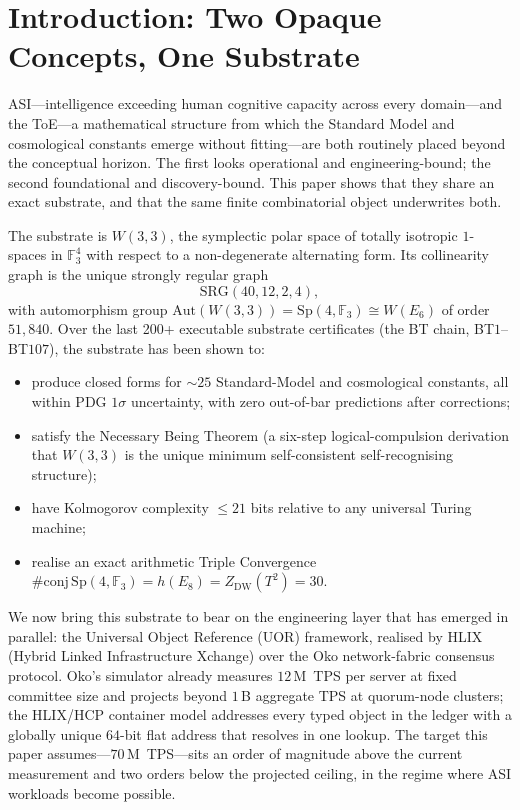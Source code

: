 \documentclass[11pt,letterpaper]{article}
\theoremstyle{remark}
\newcommand{\W}{W(3,3)}
\newcommand{\Sp}{\mathrm{Sp}}
\newcommand{\Aut}{\mathrm{Aut}}
\newcommand{\FF}{\mathbb{F}}
\newcommand{\SRG}[4]{\mathrm{SRG}(#1,#2,#3,#4)}
\begin{document}
\section{Introduction: Two Opaque Concepts, One Substrate}

ASI---intelligence exceeding human cognitive capacity across every domain---and the ToE---a
mathematical structure from which the Standard Model and cosmological constants emerge
without fitting---are both routinely placed beyond the conceptual horizon. The first looks
operational and engineering-bound; the second foundational and discovery-bound. This paper
shows that they share an exact substrate, and that the same finite combinatorial object
underwrites both.

The substrate is $\W$, the symplectic polar space of totally isotropic $1$-spaces in
$\FF_3^4$ with respect to a non-degenerate alternating form. Its collinearity graph is the
unique strongly regular graph
\[
\SRG{40}{12}{2}{4},
\]
with automorphism group $\Aut(\W)=\Sp(4,\FF_3)\cong W(E_6)$ of order $51{,}840$. Over the
last 200+ executable substrate certificates (the BT chain, BT$1$--BT$107$), the substrate
has been shown to:
\begin{itemize}[leftmargin=2em]
\item produce closed forms for $\sim\!25$ Standard-Model and cosmological constants, all
within PDG $1\sigma$ uncertainty, with zero out-of-bar predictions after corrections;
\item satisfy the Necessary Being Theorem (a six-step logical-compulsion derivation
that $\W$ is the unique minimum self-consistent self-recognising structure);
\item have Kolmogorov complexity $\le 21$ bits relative to any universal Turing machine;
\item realise an exact arithmetic Triple Convergence
$\#\mathrm{conj}\,\Sp(4,\FF_3)=h(E_8)=Z_{\mathrm{DW}}(T^2)=30$.
\end{itemize}
We now bring this substrate to bear on the engineering layer that has emerged in parallel:
the Universal Object Reference (UOR) framework, realised by HLIX (Hybrid Linked Infrastructure
Xchange) over the Oko network-fabric consensus protocol. Oko's simulator already measures
$12$\,M~TPS per server at fixed committee size and projects beyond $1$\,B aggregate TPS at
quorum-node clusters; the HLIX/HCP container model addresses every typed object in the ledger
with a globally unique $64$-bit flat address that resolves in one lookup. The target this
paper assumes---$70$\,M~TPS---sits an order of magnitude above the current measurement and
two orders below the projected ceiling, in the regime where ASI workloads become possible.
\end{document}
